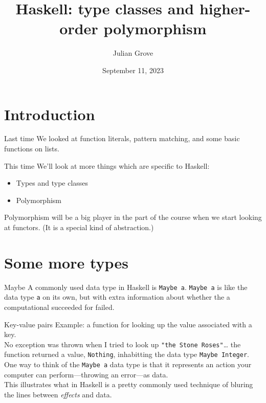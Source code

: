 \documentclass[presentation]{beamer}
\author{Julian Grove}
\date{September 11, 2023}
\title{Haskell: type classes and higher-order polymorphism}
\institute[University of Rochester]{Computational Semantics}
\begin{document}
\maketitle

\section{Introduction}
\label{sec:orgce74336}
\begin{frame}[label={sec:org3629f2a}]{Last time}
We looked at function literals, pattern matching, and some basic functions on
lists.
\end{frame}

\begin{frame}[label={sec:org6295f20}]{This time}
We'll look at more things which are specific to Haskell:
\pause
\begin{itemize}[<+->]
\item Types and type classes
\item Polymorphism
\end{itemize}
\pause
Polymorphism will be a big player in the part of the course when we start
looking at functors. (It is a special kind of abstraction.)
\end{frame}

\section{Some more types}
\label{sec:org0254fbd}
\begin{frame}[label={sec:orgb2e562a},fragile]{Maybe}
 A commonly used data type in Haskell is \texttt{Maybe a}.
\bigskip \pause
\texttt{Maybe a} is like the data type \texttt{a} on its own, but with extra information about
whether the a computational succeeded for failed.
\end{frame}

\begin{frame}[label={sec:orga7fd213},fragile]{Key-value pairs}
 Example: a function for looking up the value associated with a key. \\[0pt]
\bigskip \pause
No exception was thrown when I tried to look up \texttt{"the Stone Roses"}\ldots{} the
function returned a value, \texttt{Nothing}, inhabitting the data type \texttt{Maybe Integer}.
\\[0pt]
\bigskip \pause
One way to think of the \texttt{Maybe a} data type is that it represents an action
your computer can perform---throwing an error---as data. \\[0pt]
\bigskip \pause
This illustrates what in Haskell is a pretty commonly used technique of
bluring the lines between \emph{effects} and data.
\end{frame}
\end{document}
